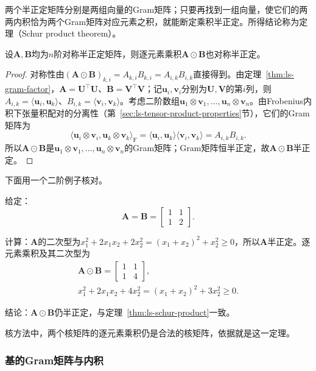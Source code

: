 两个半正定矩阵分别是两组向量的Gram矩阵；只要再找到一组向量，使它们的两两内积恰为两个Gram矩阵对应元素之积，就能断定乘积半正定。所得结论称为定理（Schur product theorem）。
\begin{theorem}[Schur乘积定理]
\label{thm:ls-schur-product}
设$\bm A,\bm B$均为$n$阶对称半正定矩阵，则逐元素乘积$\bm A\odot\bm B$也对称半正定。
\end{theorem}
\begin{proof}
对称性由$(\bm A\odot\bm B)_{k,i}=A_{k,i}B_{k,i}=A_{i,k}B_{i,k}$直接得到。由定理~\ref{thm:ls-gram-factor}，$\bm A=\bm U^\top\bm U$、$\bm B=\bm V^\top\bm V$；记$\bm u_i,\bm v_i$分别为$\bm U,\bm V$的第$i$列，则$A_{i,k}=\langle\bm u_i,\bm u_k\rangle$、$B_{i,k}=\langle\bm v_i,\bm v_k\rangle$。考虑二阶数组$\bm u_1\otimes\bm v_1,\ldots,\bm u_n\otimes\bm v_n$。由Frobenius内积下张量积配对的分离性（第~\ref{sec:ls-tensor-product-properties}节），它们的Gram矩阵为
\[
 \langle\bm u_i\otimes\bm v_i,\bm u_k\otimes\bm v_k\rangle_{\mathrm F}
 =\langle\bm u_i,\bm u_k\rangle\langle\bm v_i,\bm v_k\rangle
 =A_{i,k}B_{i,k}.
\]
所以$\bm A\odot\bm B$是$\bm u_1\otimes\bm v_1,\ldots,\bm u_n\otimes\bm v_n$的Gram矩阵；Gram矩阵恒半正定，故$\bm A\odot\bm B$半正定。
\end{proof}
下面用一个二阶例子核对。
\begin{example}[两个半正定矩阵的逐元素乘积]
\label{ex:ls-schur-product}
给定：
\[
 \bm A=\bm B=\begin{bmatrix}1&1\\1&2\end{bmatrix}.
\]

计算：$\bm A$的二次型为$x_1^2+2x_1x_2+2x_2^2=(x_1+x_2)^2+x_2^2\geq0$，所以$\bm A$半正定。逐元素乘积及其二次型为
\[
\begin{gathered}
\bm A\odot\bm B=\begin{bmatrix}1&1\\1&4\end{bmatrix},\\
x_1^2+2x_1x_2+4x_2^2=(x_1+x_2)^2+3x_2^2\geq0 .
\end{gathered}
\]

结论：$\bm A\odot\bm B$仍半正定，与定理~\ref{thm:ls-schur-product}一致。
\end{example}
核方法中，两个核矩阵的逐元素乘积仍是合法的核矩阵，依据就是这一定理。

\subsubsection{基的Gram矩阵与内积}
\label{sec:ls-gram-coordinates}

